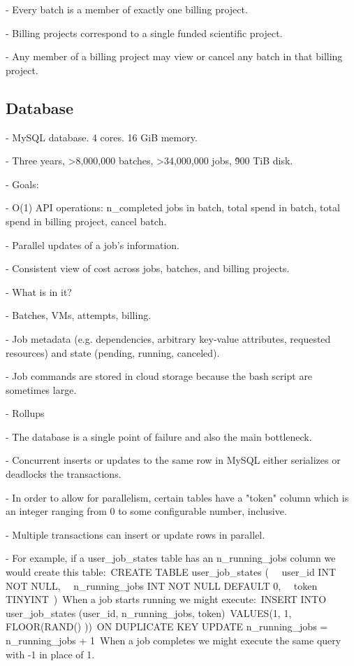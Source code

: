 \documentclass[sigconf, nonacm]{acmart}
\begin{document}
    - Every batch is a member of exactly one billing project.

    - Billing projects correspond to a single funded scientific project.

    - Any member of a billing project may view or cancel any batch in that billing project.

\subsection{Database}

    - MySQL database. 4 cores. 16 GiB memory.

    - Three years, >8,000,000 batches, >34,000,000 jobs, \~900 TiB disk.

    - Goals:

      - O(1) API operations: n\_completed jobs in batch, total spend in batch, total spend in billing project, cancel batch.

      - Parallel updates of a job’s information.

      - Consistent view of cost across jobs, batches, and billing projects.

    - What is in it?

      - Batches, VMs, attempts, billing.

      - Job metadata (e.g. dependencies, arbitrary key-value attributes, requested resources) and state (pending, running, canceled).

      - Job commands are stored in cloud storage because the bash script are sometimes large.

    - Rollups

      - The database is a single point of failure and also the main bottleneck.

      - Concurrent inserts or updates to the same row in MySQL either serializes or deadlocks the transactions.

      - In order to allow for parallelism, certain tables have a "token" column which is an integer ranging from 0 to some configurable number, inclusive.

      - Multiple transactions can insert or update rows in parallel.

      - For example, if a user\_job\_states table has an n\_running\_jobs column we would create this table:\
        CREATE TABLE user\_job\_states (\
          user\_id INT NOT NULL,\
          n\_running\_jobs INT NOT NULL DEFAULT 0,\
          token TINYINT\
        )\
        When a job starts running we might execute:\
        INSERT INTO user\_job\_states (user\_id, n\_running\_jobs, token)\
        VALUES(1, 1, FLOOR(RAND() ))\
        ON DUPLICATE KEY UPDATE n\_running\_jobs = n\_running\_jobs + 1\
        When a job completes we might execute the same query with -1 in place of 1.
\end{document}

